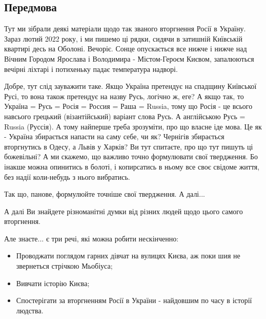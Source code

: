  
 
 
 
 
\subsection{Передмова}

Тут ми зібрали деякі матеріали щодо так званого вторгнення Росії в Україну.
Зараз лютий 2022 року, і ми пишемо ці рядки, сидячи в затишній Київській
квартирі десь на Оболоні. Вечоріє. Сонце опускається все нижче і нижче над
Вічним Городом Ярослава і Володимира - Містом-Героєм Києвом, запалюються
вечірні ліхтарі і потихеньку падає температура надворі.

Добре, тут слід зауважити таке. Якщо Україна претендує на спадщину Київської
Русі, то вона також претендує на назву Русь, логічно ж, еге? А якщо так, то
Україна = Русь = Росія = Россия = Раша = Russia, тому що Росія - це всього
навсього грецький (візантійський) варіант слова Русь. А англійською Русь =
Russia (Руссія). А тому найперше треба зрозуміти, про що власне іде мова. Це як
- Україна збирається напасти на саму себе, чи як?  Чернігів збирається
вторгнутись в Одесу, а Львів у Харків? Ви тут спитаєте, про що тут пишуть ці
божевільні?  А ми скажемо, що важливо точно формулювати свої твердження. Бо
інакше можна опинитись в болоті, і копирсатись в ньому все своє свідоме життя,
без надії коли-небудь з нього вибратись.

Так що, панове, формулюйте точніше свої твердження. А далі...

А далі Ви знайдете різноманітні думки від різних людей щодо цього самого
вторгнення.

Але знаєте... є три речі, які можна робити нескінченно:

\begin{itemize} %
\item Проводжати поглядом гарних дівчат на вулицях Києва, аж поки шия не звернеться стрічкою Мьобіуса;
\item Вивчати історію Києва;
\item Спостерігати за вторгненням Росії в України - найдовшим по часу в історії людства.
\end{itemize} %


